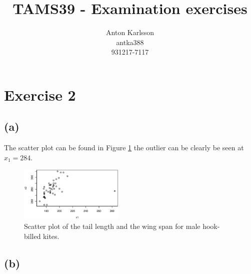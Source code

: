 \message{ !name(examination.tex)}\documentclass[one column]{report}
\title{TAMS39 - Examination exercises}
\author{Anton Karlsson\\antka388\\931217-7117}
\date{}
\begin{document}
\section*{Exercise 2}
\label{sec:exercise-2}

\subsection*{(a)}
\label{sec:a-1}

The scatter plot can be found in Figure \ref{fig:ex2-scatter} the outlier can be
clearly be seen at $x_1 = 284$.
\begin{figure}[h]
  \centering
  \includegraphics[width=5cm]{ex2-scatterplot}
  \caption{Scatter plot of the tail length and the wing span for male
    hook-billed kites.}
  \label{fig:ex2-scatter}
\end{figure}

\subsection*{(b)}
\label{sec:b-1}
\end{document}
